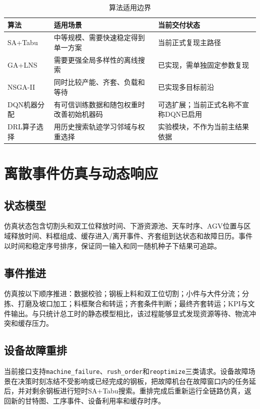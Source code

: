 \documentclass[UTF8,zihao=-4,openany]{ctexrep}
\newcommand{\code}[1]{\texttt{#1}}
\begin{document}
\begin{table}[H]
\centering
\caption{算法适用边界}
\begin{tabularx}{\textwidth}{p{}YY}
\toprule
算法 & 适用场景 & 当前交付状态 \\
\midrule
SA+Tabu & 中等规模、需要快速稳定得到单一方案 & 当前正式复现主路径 \\
GA+LNS & 需要更强全局多样性的离线搜索 & 已实现，需单独固定参数复现 \\
NSGA-II & 同时比较产能、齐套、负载和等待 & 已实现多目标前沿 \\
DQN机器分配 & 有可信训练数据和随包权重时改善初始机器码 & 可选扩展；当前正式名称不宣称DQN已启用 \\
DRL算子选择 & 用历史搜索轨迹学习邻域与权重选择 & 实验模块，不作为当前主结果依据 \\
\bottomrule
\end{tabularx}
\end{table}

\chapter{离散事件仿真与动态响应}

\section{状态模型}

仿真状态包含切割头和双工位释放时间、下游资源池、天车时序、AGV位置与区域释放时间、料框组成、缓存进入/离开事件、齐套组到达状态和故障日历。事件以时间和稳定序号排序，保证同一输入和同一随机种子下结果可追踪。

\section{事件推进}

仿真按以下顺序推进：数据校验；钢板上料和双工位切割；小件与大件分流；分拣、打磨及坡口加工；料框聚合和转运；齐套条件判断；最终齐套转运；KPI与文件输出。与只统计总工时的静态模型相比，该过程能够显式发现资源等待、物流冲突和缓存压力。

\section{设备故障重排}

当前接口支持\code{machine\_failure}、\code{rush\_order}和\code{reoptimize}三类请求。设备故障场景在决策时刻冻结不受影响或已经完成的钢板，把故障机台在故障窗口内的任务延后，并对剩余钢板进行短时SA+Tabu搜索。重排完成后重新运行全链路仿真，返回新的甘特图、工序事件、设备利用率和缓存时序。
\end{document}
